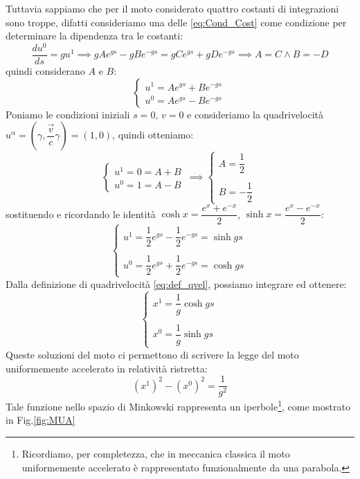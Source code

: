 Tuttavia sappiamo che per il moto considerato quattro costanti di integrazioni sono troppe, difatti consideriamo una delle \eqref{eq:Cond_Cost} come condizione per determinare la dipendenza tra le costanti:
 \begin{equation*}
     \dfrac{du^0}{ds}=gu^1 \implies gAe^{gs}-gBe^{-gs}=gCe^{gs}+gDe^{-gs}
\implies A=C \land B=-D
\end{equation*} quindi considerano $A$ e $B$:
\begin{equation*}
   \begin{cases}
      u^1=Ae^{gs}+Be^{-gs}
      \\
     u^0=Ae^{gs}-Be^{-gs}
      \end{cases}\, 
\end{equation*}
Poniamo le condizioni iniziali $s=0$, $v=0$ e consideriamo la quadrivelocità $u^\alpha=(\gamma,\dfrac{\Vec{v}}{c}\gamma)=(1,0)$, quindi otteniamo:
\begin{equation}
   \begin{cases}
     u^1=0=A+B
      \\
     u^0=1=A-B 
      \end{cases}\, 
      \implies
    \begin{cases}
      A=\dfrac{1}{2}
      \\
      \\
      B=-\dfrac{1}{2}
      \end{cases}\, 
\end{equation}
sostituendo e ricordando le identità $\cosh{x}=\dfrac{e^x+e^{-x}}{2}$, $\sinh{x}=\dfrac{e^x-e^{-x}}{2}$:
\begin{equation}
   \begin{cases}
      u^1=\dfrac{1}{2} e^{gs}-\dfrac{1}{2}e^{-gs}=\sinh{gs}
      \\
      \\
     u^0=\dfrac{1}{2}e^{gs}+\dfrac{1}{2}e^{-gs}=\cosh{gs}
      \end{cases}\, 
\end{equation}
Dalla definizione di quadrivelocità \eqref{eq:def_qvel}, possiamo integrare ed ottenere:
\begin{equation}\label{eq:solu_rindler}
   \begin{cases}
      x^1=\dfrac{1}{g}\cosh{gs}
      \\
      \\
     x^0=\dfrac{1}{g}\sinh{gs}
      \end{cases}\, 
\end{equation}
Queste soluzioni del moto ci permettono di scrivere la legge del moto uniformemente accelerato in relatività ristretta:
\begin{equation}
    (x^1)^2-(x^0)^2=\dfrac{1}{g^2}
\end{equation}
Tale funzione nello spazio di Minkowski rappresenta un iperbole\footnote{Ricordiamo, per completezza, che in meccanica classica il moto uniformemente accelerato è rappresentato funzionalmente da una parabola.}, come mostrato in Fig.\ref{fig:MUA}

